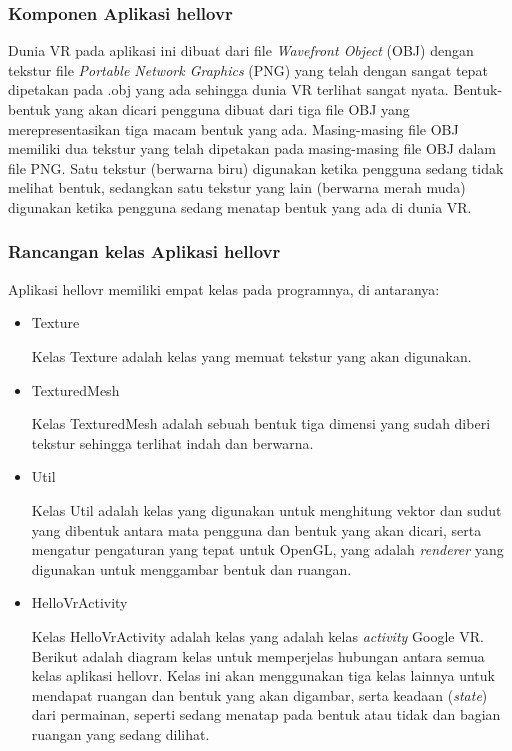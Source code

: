 \subsubsection{Komponen Aplikasi hellovr}
Dunia VR pada aplikasi ini dibuat dari file {\it Wavefront Object} (OBJ) dengan tekstur file {\it Portable Network Graphics} (PNG) yang telah dengan sangat tepat dipetakan pada .obj yang ada sehingga dunia VR terlihat sangat nyata. Bentuk-bentuk yang akan dicari pengguna dibuat dari tiga file OBJ yang merepresentasikan tiga macam bentuk yang ada. Masing-masing file OBJ memiliki dua tekstur yang telah dipetakan pada masing-masing file OBJ dalam file PNG. Satu tekstur (berwarna biru) digunakan ketika pengguna sedang tidak melihat bentuk, sedangkan satu tekstur yang lain (berwarna merah muda) digunakan ketika pengguna sedang menatap bentuk yang ada di dunia VR.

\subsubsection{Rancangan kelas Aplikasi hellovr}
Aplikasi hellovr memiliki empat kelas pada programnya, di antaranya: 
\begin{itemize}
	\item Texture
	
	Kelas Texture adalah kelas yang memuat tekstur yang akan digunakan.
	\item TexturedMesh
	
	Kelas TexturedMesh adalah sebuah bentuk tiga dimensi yang sudah diberi tekstur sehingga terlihat indah dan berwarna.
	\item Util
	
	Kelas Util adalah kelas yang digunakan untuk menghitung vektor dan sudut yang dibentuk antara mata pengguna dan bentuk yang akan dicari, serta mengatur pengaturan yang tepat untuk OpenGL, yang adalah {\it renderer} yang digunakan untuk menggambar bentuk dan ruangan.
	\item HelloVrActivity
	
	Kelas HelloVrActivity adalah kelas yang adalah kelas {\it activity} Google VR. Berikut adalah diagram kelas untuk memperjelas hubungan antara semua kelas aplikasi hellovr. Kelas ini akan menggunakan tiga kelas lainnya untuk mendapat ruangan dan bentuk yang akan digambar, serta keadaan ({\it state}) dari permainan, seperti sedang menatap pada bentuk atau tidak dan bagian ruangan yang sedang dilihat.
\end{itemize}

 


